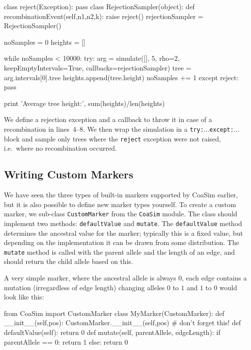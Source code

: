\documentclass{manual}
\begin{document}
\begin{empfile}
\begin{ncode}
class reject(Exception): pass
class RejectionSampler(object):
    def recombinationEvent(self,n1,n2,k):
        raise reject()
rejectionSampler = RejectionSampler()

noSamples = 0
heights = []

while noSamples < 10000:
    try:
        arg = simulate([], 5, rho=2, keepEmptyIntervals=True,
                       callbacks=rejectionSampler)
        tree = arg.intervals[0].tree
        heights.append(tree.height)
        noSamples += 1
    except reject:
        pass

print 'Average tree height:', sum(heights)/len(heights)
\end{ncode}

\noindent
We define a rejection exception and a callback to throw it in case of
a recombination in lines~4--8.  We then wrap the simulation in a
\texttt{try:$\ldots$except:$\ldots$} block and sample only trees where
the \texttt{reject} exception were not raised, i.e.\ where no
recombination occurred.

\subsection{Writing Custom Markers}
\label{sec:writ-cust-mark}

We have seen the three types of built-in markers supported by CoaSim
earlier, but it is also possible to define new marker types yourself.
To create a custom marker, we sub-class \texttt{CustomMarker} from the
\texttt{CoaSim} module.  The class should implement two methods:
\texttt{defaultValue} and \texttt{mutate}.  The \texttt{defaultValue}
method determines the ancestral value for the marker; typically this
is a fixed value, but depending on the implementation it can be drawn
from some distribution.  The \texttt{mutate} method is called with the
parent allele and the length of an edge, and should return the child
allele based on this.

A very simple marker, where the ancestral allele is always $0$, each
edge contains a mutation (irregardless of edge length) changing
alleles $0$ to $1$ and $1$ to $0$ would look like this:
\begin{code}
from CoaSim import CustomMarker
class MyMarker(CustomMarker):
    def __init__(self,pos):
        CustomMarker.__init__(self,pos) # don't forget this!
    def defaultValue(self):
        return 0
    def mutate(self, parentAllele, edgeLength):
        if parentAllele == 0: return 1
        else:                 return 0
\end{code}


\end{empfile}
\end{document}
